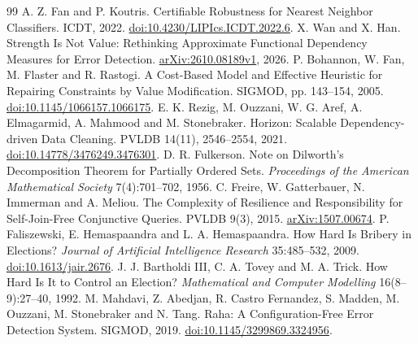 \documentclass[11pt]{article}
\theoremstyle{remark}
\begin{document}
\begin{thebibliography}{99}
 A. Z. Fan and P. Koutris. Certifiable Robustness for Nearest
Neighbor Classifiers. ICDT, 2022.
\href{https://doi.org/10.4230/LIPIcs.ICDT.2022.6}{doi:10.4230/LIPIcs.ICDT.2022.6}.
 X. Wan and X. Han. Strength Is Not Value: Rethinking Approximate
Functional Dependency Measures for Error Detection.
\href{https://arxiv.org/abs/2610.08189v1}{arXiv:2610.08189v1}, 2026.
 P. Bohannon, W. Fan, M. Flaster and R. Rastogi. A
Cost-Based Model and Effective Heuristic for Repairing Constraints by Value
Modification. SIGMOD, pp. 143--154, 2005.
\href{https://doi.org/10.1145/1066157.1066175}{doi:10.1145/1066157.1066175}.
 E. K. Rezig, M. Ouzzani, W. G. Aref, A. Elmagarmid,
A. Mahmood and M. Stonebraker. Horizon: Scalable Dependency-driven Data
Cleaning. PVLDB 14(11), 2546--2554, 2021.
\href{https://doi.org/10.14778/3476249.3476301}{doi:10.14778/3476249.3476301}.
 D. R. Fulkerson. Note on Dilworth's Decomposition Theorem
for Partially Ordered Sets. \emph{Proceedings of the American Mathematical
Society} 7(4):701--702, 1956.
 C. Freire, W. Gatterbauer, N. Immerman and A. Meliou.
The Complexity of Resilience and Responsibility for Self-Join-Free
Conjunctive Queries. PVLDB 9(3), 2015.
\href{https://arxiv.org/abs/1507.00674}{arXiv:1507.00674}.
 P. Faliszewski, E. Hemaspaandra and L. A. Hemaspaandra.
How Hard Is Bribery in Elections? \emph{Journal of Artificial Intelligence
Research} 35:485--532, 2009.
\href{https://doi.org/10.1613/jair.2676}{doi:10.1613/jair.2676}.
 J. J. Bartholdi III, C. A. Tovey and M. A. Trick. How Hard
Is It to Control an Election? \emph{Mathematical and Computer Modelling}
16(8--9):27--40, 1992.
 M. Mahdavi, Z. Abedjan, R. Castro Fernandez, S. Madden,
M. Ouzzani, M. Stonebraker and N. Tang. Raha: A Configuration-Free Error
Detection System. SIGMOD, 2019.
\href{https://doi.org/10.1145/3299869.3324956}{doi:10.1145/3299869.3324956}.
\end{thebibliography}
\end{document}

